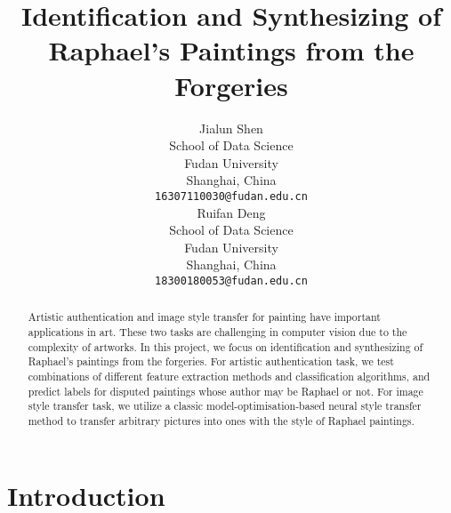 \documentclass{article}
\title{Identification and Synthesizing of Raphael’s Paintings from the Forgeries}
\author{%
  Jialun Shen \\
  School of Data Science\\
  Fudan University\\
  Shanghai, China \\
  \texttt{16307110030@fudan.edu.cn} \\
  \And
  Ruifan Deng \\
  School of Data Science \\
  Fudan University\\
  Shanghai, China \\
  \texttt{18300180053@fudan.edu.cn} \\
}
\begin{document}
\maketitle

\begin{abstract}
  Artistic authentication and image style transfer for painting have important applications in art. These two tasks are challenging in computer vision due to the complexity of artworks. In this project, we focus on identification and synthesizing of Raphael’s paintings from the forgeries.
  For artistic authentication task, we test combinations of different feature extraction methods and classification algorithms, and predict labels for disputed paintings whose author may be Raphael or not. 
  For image style transfer task, we utilize a classic model-optimisation-based neural style transfer method to transfer arbitrary pictures into ones with the style of Raphael paintings.
\end{abstract}

\section{Introduction}


\end{document}
